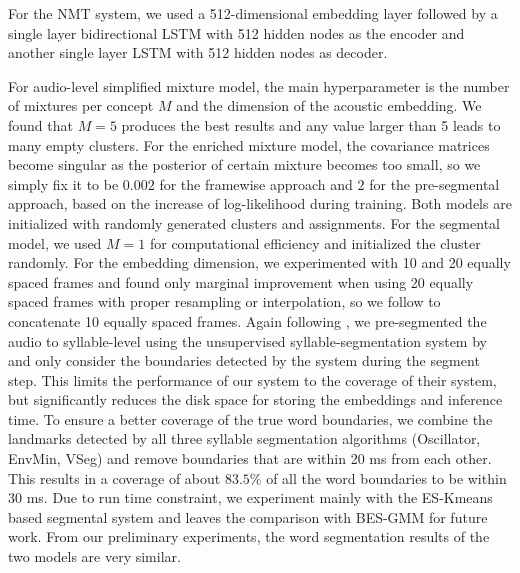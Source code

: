 \documentclass[journal]{IEEEtran}
\begin{document}
For the NMT system, we used a 512-dimensional embedding layer followed by a single layer bidirectional LSTM with 512 hidden nodes as the encoder and another single layer LSTM with 512 hidden nodes as decoder. %

For audio-level simplified mixture model, the main hyperparameter is the number of mixtures per concept $M$ and the dimension of the acoustic embedding. We found that $M=5$ produces the best results and any value larger than 5 leads to many empty clusters. For the enriched mixture model, the covariance matrices become singular as the posterior of certain mixture becomes too small, so we simply fix it to be $0.002$ for the framewise approach and $2$ for the pre-segmental approach, based on the increase of log-likelihood during training. Both models are initialized with randomly generated clusters and assignments. For the segmental model, we used $M=1$ for computational efficiency and initialized the cluster randomly. For the embedding dimension, we experimented with 10 and 20 equally spaced frames and found only marginal improvement when using 20 equally spaced frames  with proper resampling or interpolation, so we follow \cite{Kamper2017} to concatenate 10 equally spaced frames. 
Again following \cite{Kamper2016}, we pre-segmented the audio to syllable-level using the unsupervised syllable-segmentation system by \cite{Rasanen2015} and only consider the boundaries detected by the system during the segment step. This limits the performance of our system to the coverage of their system, but significantly reduces the disk space for storing the embeddings and inference time. To ensure a better coverage of the true word boundaries, we combine the landmarks detected by all three syllable segmentation algorithms (Oscillator, EnvMin, VSeg) \cite{Rasanen2015} and remove boundaries that are within 20 ms from each other. This results in a coverage of about $83.5 \%$ of all the word boundaries to be within 30 ms. Due to run time constraint, we experiment mainly with the ES-Kmeans based segmental system and leaves the comparison with BES-GMM for future work. From our preliminary experiments, the word segmentation results of the two models are very similar.
\end{document}

